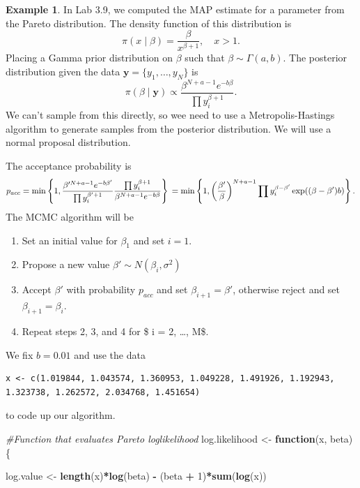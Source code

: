 \documentclass[
]{book}
\newenvironment{Shaded}{\begin{snugshade}}{\end{snugshade}}
\newcommand{\CommentTok}[1]{\textcolor[rgb]{0.56,0.35,0.01}{\textit{#1}}}
\newcommand{\ControlFlowTok}[1]{\textcolor[rgb]{0.13,0.29,0.53}{\textbf{#1}}}
\newcommand{\DecValTok}[1]{\textcolor[rgb]{0.00,0.00,0.81}{#1}}
\newcommand{\FunctionTok}[1]{\textcolor[rgb]{0.13,0.29,0.53}{\textbf{#1}}}
\newcommand{\NormalTok}[1]{#1}
\newcommand{\OtherTok}[1]{\textcolor[rgb]{0.56,0.35,0.01}{#1}}
\newcommand{\SpecialCharTok}[1]{\textcolor[rgb]{0.81,0.36,0.00}{\textbf{#1}}}
\providecommand{\tightlist}{%
  \setlength{\itemsep}{0pt}\setlength{\parskip}{0pt}}
\theoremstyle{definition}
\theoremstyle{definition}
\newtheorem{example}{Example}[chapter]
\theoremstyle{definition}
\theoremstyle{definition}
\theoremstyle{remark}
\begin{document}
\begin{example}
In Lab 3.9, we computed the MAP estimate for a parameter from the Pareto distribution. The density function of this distribution is
\[
\pi(x \mid \beta) = \frac{\beta}{x^{\beta + 1}}, \quad x > 1. 
\]
Placing a Gamma prior distribution on \(\beta\) such that \(\beta \sim \Gamma(a, b)\). The posterior distribution given the data \(\boldsymbol{y} = \{y_1, \ldots, y_N\}\) is
\[
\pi(\beta \mid \boldsymbol{y}) \propto \frac{\beta^{N + a - 1}e^{-b\beta}}{\prod y_i^{\beta + 1}}.
\]
We can't sample from this directly, so wee need to use a Metropolis-Hastings algorithm to generate samples from the posterior distribution. We will use a normal proposal distribution.

The acceptance probability is
\[
p_{acc} = \min \left\{1, \frac{\beta'^{N + a - 1}e^{-b\beta'}}{\prod y_i^{\beta' + 1}}\frac{\prod y_i^{\beta + 1}}{\beta^{N + a - 1}e^{-b\beta}} \right\} \\
= \min \left\{1, \left(\frac{\beta'}{\beta}\right)^{N + a - 1}{\prod y_i^{\beta - \beta'}}\exp((\beta - \beta')b) \right\}. 
\]
The MCMC algorithm will be

\begin{enumerate}
\def\labelenumi{\arabic{enumi}.}
\tightlist
\item
  Set an initial value for \(\beta_1\) and set \(i =1\).
\item
  Propose a new value \(\beta' \sim N(\beta_i, \sigma^2)\)
\item
  Accept \(\beta'\) with probability \(p_{acc}\) and set \(\beta_{i+1}= \beta'\), otherwise reject and set\(\beta_{i+1}= \beta_i\).
\item
  Repeat steps 2, 3, and 4 for \$ i = 2, \ldots, M\$.
\end{enumerate}

We fix \(b=0.01\) and use the data

\begin{verbatim}
x <- c(1.019844, 1.043574, 1.360953, 1.049228, 1.491926, 1.192943, 1.323738, 1.262572, 2.034768, 1.451654)
\end{verbatim}

to code up our algorithm.

\begin{Shaded}
\begin{Highlighting}[]
\CommentTok{\#Function that evaluates Pareto loglikelihood}
\NormalTok{log.likelihood }\OtherTok{\textless{}{-}} \ControlFlowTok{function}\NormalTok{(x, beta)\{}

\NormalTok{  log.value }\OtherTok{\textless{}{-}} \FunctionTok{length}\NormalTok{(x)}\SpecialCharTok{*}\FunctionTok{log}\NormalTok{(beta) }\SpecialCharTok{{-}}\NormalTok{ (beta }\SpecialCharTok{+} \DecValTok{1}\NormalTok{)}\SpecialCharTok{*}\FunctionTok{sum}\NormalTok{(}\FunctionTok{log}\NormalTok{(x))}


\end{Highlighting}
\end{Shaded}
\end{example}
\end{document}
